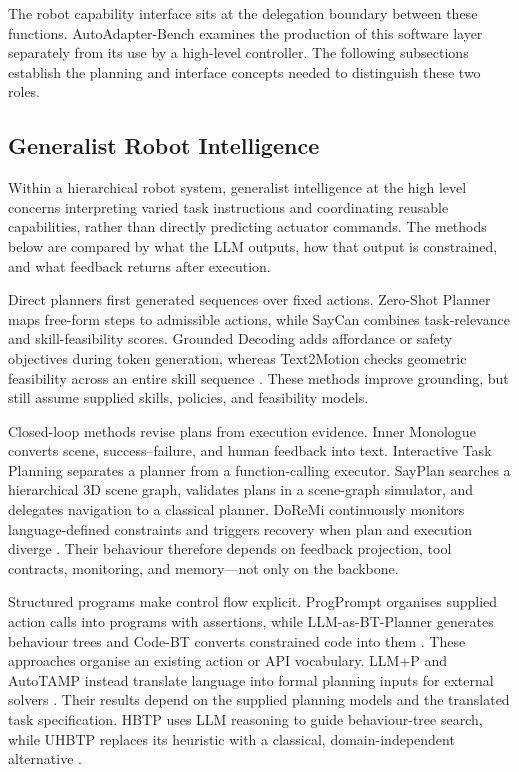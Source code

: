 The robot capability interface sits at the delegation boundary between these
functions. AutoAdapter-Bench examines the production of this software layer
separately from its use by a high-level controller. The following subsections
establish the planning and interface concepts needed to distinguish these two
roles.

\subsection{Generalist Robot Intelligence}
\label{sec:generalist-robot-intelligence}

Within a hierarchical robot system, generalist intelligence at the high level
concerns interpreting varied task instructions and coordinating reusable
capabilities, rather than directly predicting actuator commands. The methods
below are compared by what the LLM outputs, how that output is constrained,
and what feedback returns after execution.

Direct planners first generated sequences over fixed actions. Zero-Shot
Planner maps free-form steps to admissible actions, while SayCan combines
task-relevance and skill-feasibility scores. Grounded Decoding adds affordance
or safety objectives during token generation, whereas Text2Motion checks
geometric feasibility across an entire skill sequence
\citep{huang2022zeroshotplanner,ahn2022saycan,
huang2023groundeddecoding,lin2023text2motion}. These methods improve
grounding, but still assume supplied skills, policies, and feasibility models.

Closed-loop methods revise plans from execution evidence. Inner Monologue
converts scene, success--failure, and human feedback into text. Interactive
Task Planning separates a planner from a function-calling executor. SayPlan
searches a hierarchical 3D scene graph, validates plans in a scene-graph
simulator, and delegates navigation to a classical planner. DoReMi continuously
monitors language-defined constraints and triggers recovery when plan and
execution diverge
\citep{huang2023innermonologue,li2025interactiveplanning,
rana2023sayplan,guo2024doremi}. Their behaviour therefore depends on feedback
projection, tool contracts, monitoring, and memory---not only on the backbone.

Structured programs make control flow explicit. ProgPrompt organises supplied
action calls into programs with assertions, while LLM-as-BT-Planner generates
behaviour trees and Code-BT converts constrained code into them
\citep{singh2023progprompt,ao2025llmbtplanner,zhang2025codebt}.
These approaches organise an existing action or API vocabulary.
LLM+P and AutoTAMP instead translate language into formal planning inputs for
external solvers \citep{liu2023llmplusp,chen2024autotamp}.
Their results depend on the supplied planning models and the translated task
specification. HBTP uses LLM reasoning to guide behaviour-tree search, while
UHBTP replaces its heuristic with a classical, domain-independent alternative
\citep{cai2025hbtp,chen2025btpg}.

